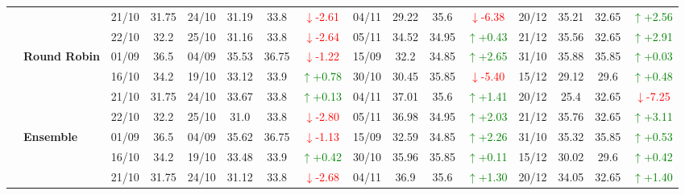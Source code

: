 {\begin{longtable}{llcc|cccc|cccc|cccc}
&
& 21/10 & 31.75 & 24/10 & 31.19 & 33.8 & \textcolor{red}{\(\downarrow\)-2.61} & 04/11 & 29.22 & 35.6 & \textcolor{red}{\(\downarrow\)-6.38} & 20/12 & 35.21 & 32.65 & \textcolor{green}{\(\uparrow\)+2.56} \\

&
& 22/10 & 32.2 & 25/10 & 31.16 & 33.8 & \textcolor{red}{\(\downarrow\)-2.64} & 05/11 & 34.52 & 34.95 & \textcolor{green}{\(\uparrow\)+0.43} & 21/12 & 35.56 & 32.65 & \textcolor{green}{\(\uparrow\)+2.91} \\
\cmidrule(lr){2-16}


& \textbf{Round Robin}
& 01/09 & 36.5 & 04/09 & 35.53 & 36.75 & \textcolor{red}{\(\downarrow\)-1.22} & 15/09 & 32.2 & 34.85 & \textcolor{green}{\(\uparrow\)+2.65} & 31/10 & 35.88 & 35.85 & \textcolor{green}{\(\uparrow\)+0.03} \\

&
& 16/10 & 34.2 & 19/10 & 33.12 & 33.9 & \textcolor{green}{\(\uparrow\)+0.78} & 30/10 & 30.45 & 35.85 & \textcolor{red}{\(\downarrow\)-5.40} & 15/12 & 29.12 & 29.6 & \textcolor{green}{\(\uparrow\)+0.48} \\

&
& 21/10 & 31.75 & 24/10 & 33.67 & 33.8 & \textcolor{green}{\(\uparrow\)+0.13} & 04/11 & 37.01 & 35.6 & \textcolor{green}{\(\uparrow\)+1.41} & 20/12 & 25.4 & 32.65 & \textcolor{red}{\(\downarrow\)-7.25} \\

&
& 22/10 & 32.2 & 25/10 & 31.0 & 33.8 & \textcolor{red}{\(\downarrow\)-2.80} & 05/11 & 36.98 & 34.95 & \textcolor{green}{\(\uparrow\)+2.03} & 21/12 & 35.76 & 32.65 & \textcolor{green}{\(\uparrow\)+3.11} \\
\cmidrule(lr){2-16}



& \textbf{Ensemble}
& 01/09 & 36.5 & 04/09 & 35.62 & 36.75 & \textcolor{red}{\(\downarrow\)-1.13} & 15/09 & 32.59 & 34.85 & \textcolor{green}{\(\uparrow\)+2.26} & 31/10 & 35.32 & 35.85 & \textcolor{green}{\(\uparrow\)+0.53} \\

&
& 16/10 & 34.2 & 19/10 & 33.48 & 33.9 & \textcolor{green}{\(\uparrow\)+0.42} & 30/10 & 35.96 & 35.85 & \textcolor{green}{\(\uparrow\)+0.11} & 15/12 & 30.02 & 29.6 & \textcolor{green}{\(\uparrow\)+0.42} \\

&
& 21/10 & 31.75 & 24/10 & 31.12 & 33.8 & \textcolor{red}{\(\downarrow\)-2.68} & 04/11 & 36.9 & 35.6 & \textcolor{green}{\(\uparrow\)+1.30} & 20/12 & 34.05 & 32.65 & \textcolor{green}{\(\uparrow\)+1.40} \\


\end{longtable}}
